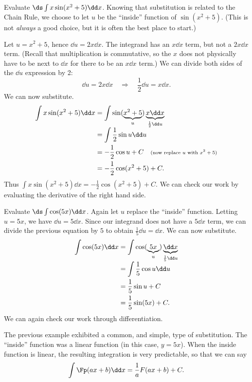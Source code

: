 \begin{example}\label{ex_sub1}%
Evaluate $\ds \int x\sin(x^2+5)\dd x$.
\solution
Knowing that substitution is related to the Chain Rule, we choose to let $u$ be the ``inside'' function of $\sin(x^2+5)$. (This is not \emph{always} a good choice, but it is often the best place to start.)

Let $u = x^2+5$, hence $\dd u = 2x\dd x$. The integrand has an $x\dd x$ term, but not a $2x\dd x$ term. (Recall that multiplication is commutative, so the $x$ does not physically have to be next to $\dd x$ for there to be an $x\dd x$ term.) We can divide both sides of the $\dd u$ expression by 2:
\[\dd u = 2x\dd x \quad \Rightarrow \quad \frac12\dd u = x\dd x.\]
We can now substitute.
\begin{align*}
	\int x\sin(x^2+5)\dd x
	&= \int \sin(\underbrace{x^2+5}_u) \underbrace{x\dd x}_{\frac12\dd u}\\[-.3\baselineskip]
	&= \int \frac12\sin u\dd u \\
	&= -\frac12\cos u + C \quad \text{\scriptsize (now replace $u$ with $x^2+5$)}\\
	&=-\frac12\cos(x^2+5) + C.
\end{align*}
Thus $\int x\sin(x^2+5)\dd x = -\frac12\cos(x^2+5)+C$. We can check our work by evaluating the derivative of the right hand side.
\end{example}

\begin{example}\label{ex_sub2}%
Evaluate $\ds \int \cos(5x)\dd x$.
\solution
Again let $u$ replace the ``inside'' function. Letting $u = 5x$, we have $\dd u = 5\dd x$. Since our integrand does not have a $5\dd x$ term, we can divide the previous equation by $5$ to obtain $\frac15\dd u = \dd x$. We can now substitute.
\begin{align*}
	\int \cos(5x)\dd x
	&= \int \cos(\underbrace{5x}_u) \underbrace{\dd x}_{\frac15\dd u} \\[-.3\baselineskip]
	&=	\int \frac15\cos u \dd u \\
	&= \frac15\sin u + C \\
	&= \frac15\sin (5x)+C.
\end{align*}
We can again check our work through differentiation.
\end{example}

The previous example exhibited a common, and simple, type of substitution. The ``inside'' function was a linear function (in this case, $y = 5x$). When the inside function is linear, the resulting integration is very predictable, so that we can say\vspace{-.3\baselineskip}
\[\int \Fp(ax+b)\dd x = \frac{1}{a}F(ax+b) + C.\]

